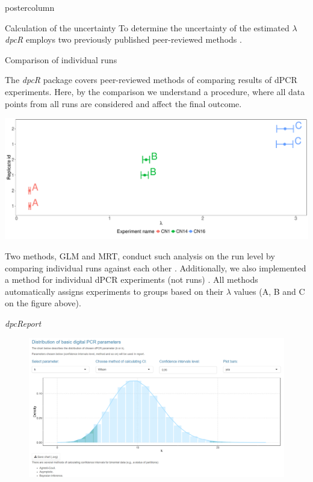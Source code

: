 \documentclass[final]{beamer}\usepackage[]{graphicx}\usepackage[]{color}
\makeatletter
\def\maxwidth{ %
  \ifdim\Gin@nat@width>\linewidth
    \linewidth
  \else
    \Gin@nat@width
  \fi
}
\makeatother
\begin{document}
\begin{frame}
\begin{columns}
\begin{column}{.54\textwidth}
\begin{beamercolorbox}[center,wd=\textwidth]{postercolumn}
\begin{minipage}[T]{.95\textwidth}
{\begin{block}{Calculation of the uncertainty}
To determine the uncertainty of the estimated $\lambda$ \textit{dpcR} employs two previously 
published peer-reviewed methods \cite{dube_mathematical_2008, bhat_single_2009}.

\end{block}
\vfill

\begin{block}{Comparison of individual runs}



The \textit{dpcR} package covers peer-reviewed methods of comparing results of 
dPCR experiments. Here, by the comparison we understand a procedure, where all 
data points from all runs are considered and affect the final outcome. 


\includegraphics[width=\maxwidth]{figure/cs2-1} 


Two methods, GLM and MRT, conduct such analysis on the run level by comparing 
individual runs against each other \citep{Burdukiewicz_tba}. Additionally, we also 
implemented a method for individual dPCR experiments (not runs) 
\citep{dorazio_statistical_2015}. All methods automatically assigns experiments to
groups based on their $\lambda$ values (A, B and C on the figure above).

\end{block}
\vfill

\begin{block}{\textit{dpcReport}}

\begin{figure}
\begin{center}
\includegraphics[width=0.76\columnwidth]{dpcR_figures/dpcReport.png}
\end{center}
\end{figure}


\end{block}}
\end{minipage}
\end{beamercolorbox}
\end{column}
\end{columns}
\end{frame}
\end{document}
